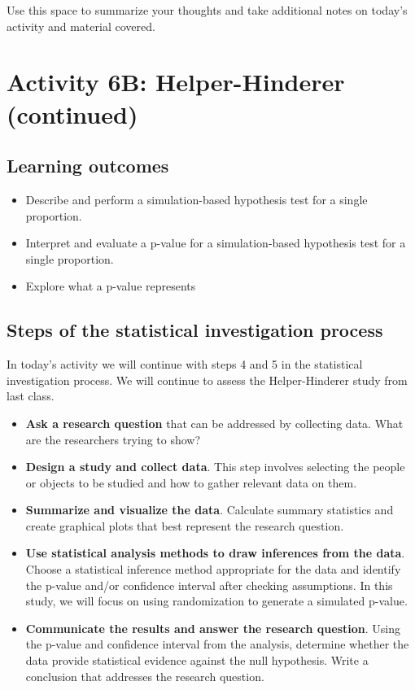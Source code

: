 \documentclass[
]{report}
\begin{document}
Use this space to summarize your thoughts and take additional notes on today's activity and material covered.

\newpage

\hypertarget{activity-6b-helper-hinderer-continued}{%
\section{Activity 6B: Helper-Hinderer (continued)}\label{activity-6b-helper-hinderer-continued}}


\hypertarget{learning-outcomes-10}{%
\subsection{Learning outcomes}\label{learning-outcomes-10}}

\begin{itemize}
\item
  Describe and perform a simulation-based hypothesis test for a single proportion.
\item
  Interpret and evaluate a p-value for a simulation-based hypothesis test for a single proportion.
\item
  Explore what a p-value represents
\end{itemize}

\hypertarget{steps-of-the-statistical-investigation-process-2}{%
\subsection{Steps of the statistical investigation process}\label{steps-of-the-statistical-investigation-process-2}}

In today's activity we will continue with steps 4 and 5 in the statistical investigation process. We will continue to assess the Helper-Hinderer study from last class.

\begin{itemize}
\item
  \textbf{Ask a research question} that can be addressed by collecting data. What are the researchers trying to show?
\item
  \textbf{Design a study and collect data}. This step involves selecting the people or objects to be studied and how to gather relevant data on them.
\item
  \textbf{Summarize and visualize the data}. Calculate summary statistics and create graphical plots that best represent the research question.
\item
  \textbf{Use statistical analysis methods to draw inferences from the data}. Choose a statistical inference method appropriate for the data and identify the p-value and/or confidence interval after checking assumptions. In this study, we will focus on using randomization to generate a simulated p-value.
\item
  \textbf{Communicate the results and answer the research question}. Using the p-value and confidence interval from the analysis, determine whether the data provide statistical evidence against the null hypothesis. Write a conclusion that addresses the research question.
\end{itemize}
\end{document}
